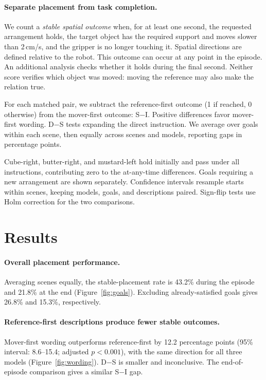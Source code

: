 \documentclass{article}
\begin{document}
\paragraph{Separate placement from task completion.}
We count a \emph{stable spatial outcome} when, for at least one second, the requested arrangement holds, the target object has the required support and moves slower than 2\,cm/s, and the gripper is no longer touching it. Spatial directions are defined relative to the robot. This outcome can occur at any point in the episode. An additional analysis checks whether it holds during the final second. Neither score verifies which object was moved: moving the reference may also make the relation true.

For each matched pair, we subtract the reference-first outcome (1 if reached, 0 otherwise) from the mover-first outcome: S$-$I. Positive differences favor mover-first wording. D$-$S tests expanding the direct instruction. We average over goals within each scene, then equally across scenes and models, reporting gaps in percentage points.

Cube-right, butter-right, and mustard-left hold initially and pass under all instructions, contributing zero to the at-any-time differences. Goals requiring a new arrangement are shown separately. Confidence intervals resample starts within scenes, keeping models, goals, and descriptions paired. Sign-flip tests use Holm correction for the two comparisons.

\clearpage
\section{Results}
\paragraph{Overall placement performance.}
Averaging scenes equally, the stable-placement rate is 43.2\% during the episode and 21.8\% at the end (Figure~\ref{fig:goals}). Excluding already-satisfied goals gives 26.8\% and 15.3\%, respectively.

\paragraph{Reference-first descriptions produce fewer stable outcomes.}
Mover-first wording outperforms reference-first by 12.2 percentage points (95\% interval: 8.6--15.4; adjusted $p<0.001$), with the same direction for all three models (Figure~\ref{fig:wording}). D$-$S is smaller and inconclusive. The end-of-episode comparison gives a similar S$-$I gap.
\end{document}
